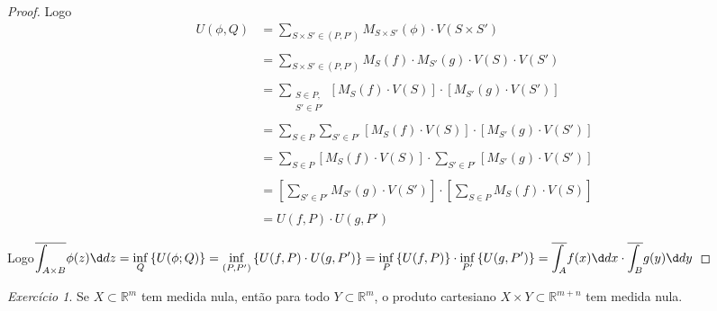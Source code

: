 \documentclass{article}
\theoremstyle{theorem}
\theoremstyle{lemma}
\theoremstyle{definition}
\theoremstyle{remark}
\newtheorem{exercicio}{Exercício}[subsection]
\begin{document}
\begin{proof}
	Logo 
	\begin{align*}
		U(\phi, Q)  &= \displaystyle \sum_{S\times S'\in (P,P')} M_{S\times S'}(\phi) \cdot V(S\times S') \\~\\
		&=\displaystyle \sum_{S\times S'\in (P,P')} M_{S}(f) \cdot M_{S'}(g)\cdot V(S)\cdot V(S') \\~\\
		&=\displaystyle \sum_{\substack{S \in P, \\ S'\in P'}}\left[ M_{S}(f)\cdot V(S) \right] \cdot \left[ M_{S'}(g)\cdot V(S') \right] \\~\\
		&=\displaystyle \sum_{S \in P} \sum_{S'\in P'} \left[ M_{S}(f)\cdot V(S) \right] \cdot \left[ M_{S'}(g)\cdot V(S') \right] \\~\\
		&=\displaystyle \sum_{S \in P}\left[ M_{S}(f)\cdot V(S) \right] \cdot \sum_{S'\in P'}  \left[ M_{S'}(g)\cdot V(S') \right] \\~\\
		&=\displaystyle \left[ \sum_{S'\in P'}   M_{S'}(g)\cdot V(S') \right]\cdot  \left[\sum_{S \in P} M_{S}(f)\cdot V(S) \right] \\~\\
		&=U(f,P)  \cdot U(g,P') 
	\end{align*}

	Logo$ \displaystyle\overline{\int_{A\times B}} \phi(z) \d dz = \inf_{Q}\left\{ U(\phi; Q)\right\} = \inf_{(P,P')}\left\{ U(f, P) \cdot U(g,P') \right\} = \inf_{P}\left\{ U(f,P)\right\} \cdot\inf_{P'}\left\{ U(g,P')\right\} = \overline{\int_{A}} f(x) \d dx \cdot \overline{\int_{ B}} g(y) \d dy $

\end{proof}
\begin{exercicio}
	Se $X\subset \mathbb{R}^m$ tem medida nula, então  para todo $Y \subset \mathbb{R}^m$, o produto cartesiano $X\times Y \subset \mathbb{R}^{m+n}$ tem medida nula.
\end{exercicio}
\end{document}
